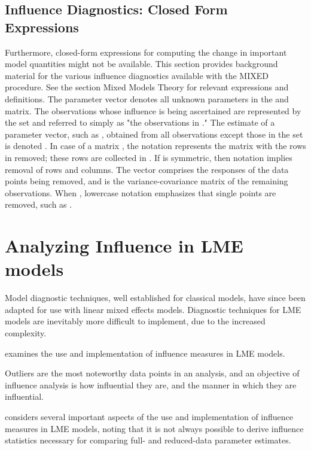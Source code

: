 \documentclass[12pt, a4paper]{report}
\theoremstyle{plain}
\theoremstyle{definition}
\theoremstyle{remark}
\begin{document}
\subsection{Influence Diagnostics: Closed Form Expressions} %



Furthermore, closed-form expressions for computing the change in important model quantities might not be available.
This section provides background material for the various influence diagnostics available with the MIXED procedure. See the section Mixed Models Theory for relevant expressions and definitions. The parameter vector  denotes all unknown parameters in the  and  matrix.
The observations whose influence is being ascertained are represented by the set  and referred to simply as "the observations in ." The estimate of a parameter vector, such as , obtained from all observations except those in the set  is denoted . In case of a matrix , the notation  represents the matrix with the rows in  removed; these rows are collected in . If  is symmetric, then notation  implies removal of rows and columns. The vector  comprises the responses of the data points being removed, and  is the variance-covariance matrix of the remaining observations. When , lowercase notation emphasizes that single points are removed, such as .



\section{Analyzing Influence in LME models}

Model diagnostic techniques, well established for classical models, have since been adapted for use with linear mixed effects models. Diagnostic techniques for LME models are inevitably more difficult to implement, due to the increased complexity.


\citet{schabenberger} examines the use and implementation of influence measures in LME models.

Outliers are the most noteworthy data points in an analysis, and an objective of influence analysis is how influential they are,
and the manner in which they are influential.


\citet{schabenberger} considers several important aspects of the use and implementation of influence measures in LME models, noting that it is not always possible to
derive influence statistics necessary for comparing full- and reduced-data parameter estimates. 
\end{document}
